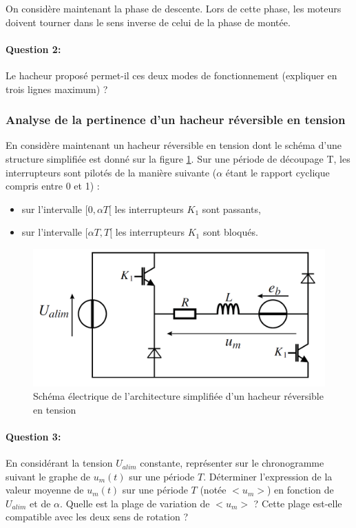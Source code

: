 On considère maintenant la phase de descente. Lors de cette phase, les moteurs doivent tourner dans le
sens inverse de celui de la phase de montée.

\paragraph{Question 2:}

Le hacheur proposé permet-il ces deux modes de fonctionnement (expliquer en trois lignes maximum) ?

\subsubsection{Analyse de la pertinence d'un hacheur réversible en tension}

En considère maintenant un hacheur réversible en tension dont le schéma d'une structure simplifiée est
donné sur la figure \ref{td02_08}. Sur une période de découpage T, les interrupteurs sont pilotés de la manière suivante ($\alpha$ étant le rapport cyclique compris entre 0 et 1) :
\begin{itemize}
 \item sur l'intervalle $[0,\alpha T[$ les interrupteurs $K_1$ sont passants,
 \item sur l'intervalle $[\alpha T , T[$ les interrupteurs $K_1$ sont bloqués.
\end{itemize}

\begin{figure}[!h]
 \centering \includegraphics[width=0.8\linewidth]{img/td02_08}
 \caption{Schéma électrique de l'architecture simplifiée d'un hacheur réversible en tension}
 \label{td02_08}
\end{figure}

\paragraph{Question 3:}

En considérant la tension $U_{alim}$ constante, représenter sur le chronogramme suivant le graphe de
$u_m(t)$ sur une période $T$. Déterminer l'expression de la valeur moyenne de $u_m(t)$ sur une période $T$ (notée $<u_m>$) en fonction de $U_{alim}$ et de $\alpha$. Quelle est la plage de variation de $<u_m>$ ? Cette plage est-elle compatible avec les deux sens de rotation ?

